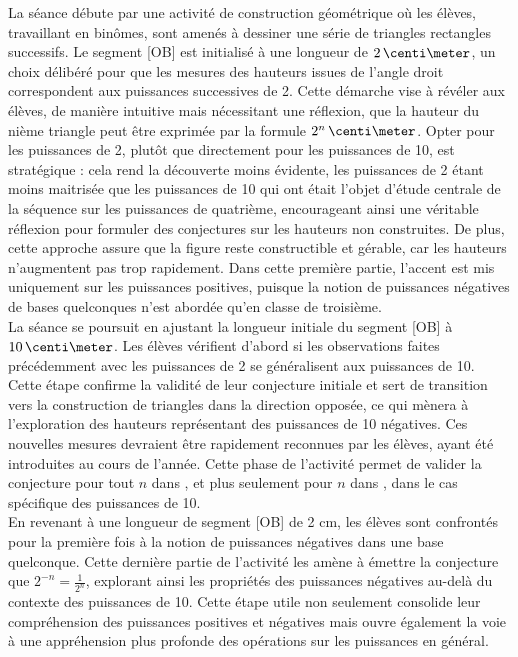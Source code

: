 La séance débute par une activité de construction géométrique où les élèves,
travaillant en binômes,
sont amenés à dessiner une série de triangles rectangles successifs.
Le segment [OB] est initialisé à une longueur de $2\cm$,
un choix délibéré pour que les mesures des hauteurs issues de l'angle droit correspondent aux puissances successives de 2.
Cette démarche vise à révéler aux élèves,
de manière intuitive mais nécessitant une réflexion,
que la hauteur du nième triangle peut être exprimée par la formule $2^n\cm$.
Opter pour les puissances de 2,
plutôt que directement pour les puissances de 10,
est stratégique :
cela rend la découverte moins évidente,
les puissances de 2 étant moins maitrisée que les puissances de 10 qui ont était l'objet d'étude centrale de la séquence sur les puissances de quatrième,
encourageant ainsi une véritable réflexion pour formuler des conjectures sur les hauteurs non construites.
De plus,
cette approche assure que la figure reste constructible et gérable,
car les hauteurs n'augmentent pas trop rapidement.
Dans cette première partie,
l'accent est mis uniquement sur les puissances positives,
puisque la notion de puissances négatives de bases quelconques n'est abordée qu'en classe de troisième.\\

La séance se poursuit en ajustant la longueur initiale du segment [OB] à $10\cm$.
Les élèves vérifient d'abord si les observations faites précédemment avec les puissances de 2 se généralisent aux puissances de 10.
Cette étape confirme la validité de leur conjecture initiale et sert de transition vers la construction de triangles dans la direction opposée,
ce qui mènera à l'exploration des hauteurs représentant des puissances de 10 négatives.
Ces nouvelles mesures devraient être rapidement reconnues par les élèves,
ayant été introduites au cours de l'année.
Cette phase de l'activité permet de valider la conjecture pour tout $n$ dans ,
et plus seulement pour $n$ dans ,
dans le cas spécifique des puissances de 10.\\

En revenant à une longueur de segment [OB] de 2 cm,
les élèves sont confrontés pour la première fois à la notion de puissances négatives dans une base quelconque.
Cette dernière partie de l'activité les amène à émettre la conjecture que $2^{-n}=\frac{1}{2^n}$,
explorant ainsi les propriétés des puissances négatives au-delà du contexte des puissances de 10.
Cette étape utile non seulement consolide leur compréhension des puissances positives et négatives mais ouvre également la voie à une appréhension plus profonde des opérations sur les puissances en général.

